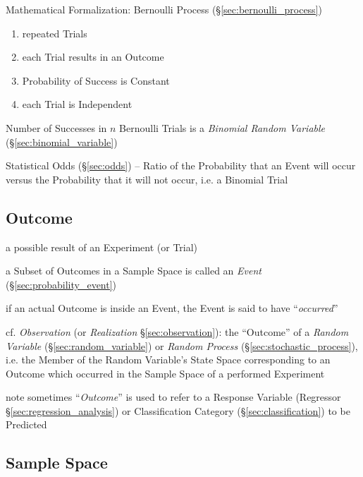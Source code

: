 Mathematical Formalization: Bernoulli Process (\S\ref{sec:bernoulli_process})

\begin{enumerate}
  \item repeated Trials
  \item each Trial results in an Outcome
  \item Probability of Success is Constant
  \item each Trial is Independent
\end{enumerate}

Number of Successes in $n$ Bernoulli Trials is a \emph{Binomial Random
  Variable} (\S\ref{sec:binomial_variable})

\fist Statistical Odds (\S\ref{sec:odds}) -- Ratio of the Probability that an
Event will occur versus the Probability that it will not occur, i.e. a Binomial
Trial



\subsection{Outcome}\label{sec:outcome}

a possible result of an Experiment (or Trial)

a Subset of Outcomes in a Sample Space is called an \emph{Event}
(\S\ref{sec:probability_event})

if an actual Outcome is inside an Event, the Event is said to have
``\emph{occurred}''

\fist cf. \emph{Observation} (or \emph{Realization} \S\ref{sec:observation}):
the ``Outcome'' of a \emph{Random Variable} (\S\ref{sec:random_variable}) or
\emph{Random Process} (\S\ref{sec:stochastic_process}), i.e. the Member of the
Random Variable's State Space corresponding to an Outcome which occurred in the
Sample Space of a performed Experiment

\fist note sometimes ``\emph{Outcome}'' is used to refer to a Response Variable
(Regressor \S\ref{sec:regression_analysis}) or Classification Category
(\S\ref{sec:classification}) to be Predicted



\subsection{Sample Space}\label{sec:sample_space}

